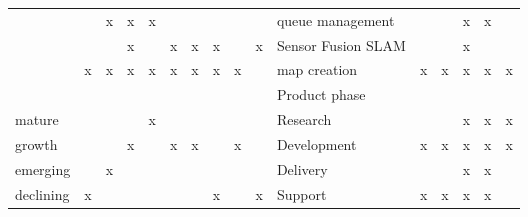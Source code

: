 \begin{table}[ht!]
{\begin{tabular}{lllllllllll|l|l|l|l|l|}
			\multicolumn{1}{l|}{} & \multicolumn{1}{l|}{} & \multicolumn{1}{l|}{x} & \multicolumn{1}{l|}{x} & \multicolumn{1}{l|}{x} & \multicolumn{1}{l|}{} & \multicolumn{1}{l|}{} & \multicolumn{1}{l|}{} & \multicolumn{1}{l|}{} & \multicolumn{1}{l|}{} & queue management &  &  & x & x &  \\ \cline{2-16}
			\multicolumn{1}{l|}{} & \multicolumn{1}{l|}{} & \multicolumn{1}{l|}{} & \multicolumn{1}{l|}{x} & \multicolumn{1}{l|}{} & \multicolumn{1}{l|}{x} & \multicolumn{1}{l|}{x} & \multicolumn{1}{l|}{x} & \multicolumn{1}{l|}{} & \multicolumn{1}{l|}{x} & Sensor Fusion SLAM &  &  & x &  &  \\ \cline{2-16}
			\multicolumn{1}{l|}{} & \multicolumn{1}{l|}{x} & \multicolumn{1}{l|}{x} & \multicolumn{1}{l|}{x} & \multicolumn{1}{l|}{x} & \multicolumn{1}{l|}{x} & \multicolumn{1}{l|}{x} & \multicolumn{1}{l|}{x} & \multicolumn{1}{l|}{x} & \multicolumn{1}{l|}{} & map creation & x & x & x & x & x \\ \cline{2-16}
			\multicolumn{1}{l|}{} & \multicolumn{1}{l|}{} & \multicolumn{1}{l|}{} & \multicolumn{1}{l|}{} & \multicolumn{1}{l|}{} & \multicolumn{1}{l|}{} & \multicolumn{1}{l|}{} & \multicolumn{1}{l|}{} & \multicolumn{1}{l|}{} & \multicolumn{1}{l|}{} & Product phase &  &  &  &  &  \\ \hline
			\multicolumn{1}{|l|}{mature} & \multicolumn{1}{l|}{} & \multicolumn{1}{l|}{} & \multicolumn{1}{l|}{} & \multicolumn{1}{l|}{x} & \multicolumn{1}{l|}{} & \multicolumn{1}{l|}{} & \multicolumn{1}{l|}{} & \multicolumn{1}{l|}{} & \multicolumn{1}{l|}{} & Research &  &  & x & x & x \\ \hline
			\multicolumn{1}{|l|}{growth} & \multicolumn{1}{l|}{} & \multicolumn{1}{l|}{} & \multicolumn{1}{l|}{x} & \multicolumn{1}{l|}{} & \multicolumn{1}{l|}{x} & \multicolumn{1}{l|}{x} & \multicolumn{1}{l|}{} & \multicolumn{1}{l|}{x} & \multicolumn{1}{l|}{} & Development & x & x & x & x & x \\ \hline
			\multicolumn{1}{|l|}{emerging} & \multicolumn{1}{l|}{} & \multicolumn{1}{l|}{x} & \multicolumn{1}{l|}{} & \multicolumn{1}{l|}{} & \multicolumn{1}{l|}{} & \multicolumn{1}{l|}{} & \multicolumn{1}{l|}{} & \multicolumn{1}{l|}{} & \multicolumn{1}{l|}{} & Delivery &  &  & x & x &  \\ \hline
			\multicolumn{1}{|l|}{declining} & \multicolumn{1}{l|}{x} & \multicolumn{1}{l|}{} & \multicolumn{1}{l|}{} & \multicolumn{1}{l|}{} & \multicolumn{1}{l|}{} & \multicolumn{1}{l|}{} & \multicolumn{1}{l|}{x} & \multicolumn{1}{l|}{} & \multicolumn{1}{l|}{x} & Support & x & x & x & x &  \\ \hline
		\end{tabular}%
	}
\end{table}
